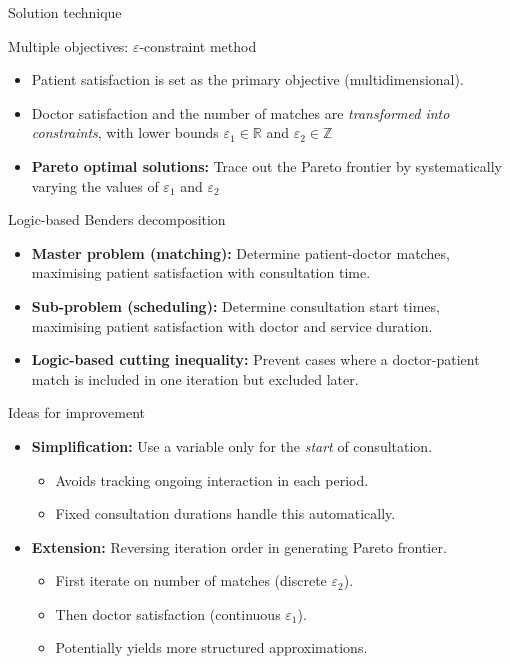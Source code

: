 \documentclass{beamer}
\begin{document}
     
\begin{frame}{Solution technique}
  \begin{block}{Multiple objectives: $\varepsilon$-constraint method}
    \begin{itemize}
      \item Patient satisfaction is set as the primary objective (multidimensional).
      \item Doctor satisfaction and the number of matches are \textit{transformed into constraints}, with lower bounds $\varepsilon_1\in\mathbb{R}$ and $\varepsilon_2\in\mathbb{Z}$
      \item \textbf{Pareto optimal solutions:} Trace out the Pareto frontier by systematically varying the values of $\varepsilon_1$ and $\varepsilon_2$
    \end{itemize}
  \end{block}
  \begin{block}{Logic-based Benders decomposition}
    \begin{itemize}
      \item \textbf{Master problem (matching):} Determine patient-doctor matches, maximising patient satisfaction with consultation time.
      \item \textbf{Sub-problem (scheduling):} Determine consultation start times, maximising patient satisfaction with doctor and service duration.
      \item \textbf{Logic-based cutting inequality:} Prevent cases where a doctor-patient match is included in one iteration but excluded later.
    \end{itemize}
  \end{block}
\end{frame}
\begin{frame}{Ideas for improvement}
  \begin{itemize}
    \item \textbf{Simplification:} Use a variable only for the \textit{start} of consultation.
    \begin{itemize}
      \item Avoids tracking ongoing interaction in each period.
      \item Fixed consultation durations handle this automatically.
    \end{itemize}
    \item \textbf{Extension:} Reversing iteration order in generating Pareto frontier.
    \begin{itemize}
      \item First iterate on number of matches (discrete $\varepsilon_2$).
      \item Then doctor satisfaction (continuous $\varepsilon_1$).
      \item Potentially yields more structured approximations.
    \end{itemize}
  \end{itemize}
\end{frame}
\end{document}
